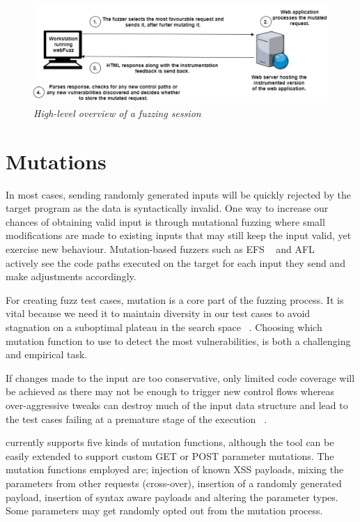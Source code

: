 \begin{figure}[ht]
 \centering
 \captionsetup{justification=centering}
 \includegraphics[width=\linewidth]{figures/architecture.pdf}
 \caption{\textit{High-level overview of a \pname{} fuzzing session}}
 \label{fig:architecture}
\end{figure}

\section{Mutations}
In most cases, sending randomly generated inputs will be quickly rejected by the target program as the data is syntactically invalid. One way to increase our chances of obtaining valid input is through mutational fuzzing where small modifications are made to existing inputs that may still keep the input valid, yet exercise new behaviour. Mutation-based fuzzers such as EFS ~\cite{efs2007} and AFL ~\cite{zalewski2015american} actively see the code paths executed on the target for each input they send and make adjustments accordingly. 

For creating fuzz test cases, mutation is a core part of the fuzzing process. It is vital because we need it to maintain diversity in our test cases to avoid stagnation on a suboptimal plateau in the search space ~\cite{seal2016Genetic}. Choosing which mutation function to use to detect the most vulnerabilities, is both a challenging and empirical task. 

If changes made to the input are too conservative, only limited code coverage will be achieved as there may not be enough to trigger new control flows whereas over-aggressive tweaks can destroy much of the input data structure and lead to the test cases failing at a premature stage of the execution ~\cite{zalewski2014Mutations}.

\pname{} currently supports five kinds of mutation functions, although the tool can be easily
extended to support custom GET or POST parameter mutations. The mutation functions employed are; injection of known XSS payloads, mixing the parameters from other requests (cross-over), insertion of a randomly generated payload, insertion of syntax aware payloads and altering the
parameter types. Some parameters may get randomly opted out from the mutation process. 

